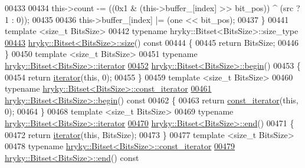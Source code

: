\begin{DoxyCode}
00433 
00434     this->count -= ((0x1 & (this->buffer\_[index] >> bit\_pos)) ^ (src ? 1 : 0));
00435 
00436     this->buffer\_[index] |= (one << bit\_pos);
00437 \}
00441 \textcolor{keyword}{template} <\textcolor{keywordtype}{size\_t} BitsSize>
00442 \textcolor{keyword}{typename} hryky::Bitset<BitsSize>::size\_type
\hypertarget{bitset_8h_source_l00443}{}\hyperlink{classhryky_1_1_bitset_a0d41c36d998c4e7bbd1c3d12b9ea199c}{00443} \hyperlink{classhryky_1_1_bitset}{hryky::Bitset<BitsSize>::size}()\textcolor{keyword}{ const}
00444 \textcolor{keyword}{}\{
00445     \textcolor{keywordflow}{return} BitsSize;
00446 \}
00450 \textcolor{keyword}{template} <\textcolor{keywordtype}{size\_t} BitsSize>
00451 \textcolor{keyword}{typename} \hyperlink{classhryky_1_1iterator_1_1random_1_1_mutable}{hryky::Bitset<BitsSize>::iterator} 
\hypertarget{bitset_8h_source_l00452}{}\hyperlink{classhryky_1_1_bitset_aabb589198362742daad95e914b590187}{00452} \hyperlink{classhryky_1_1_bitset}{hryky::Bitset<BitsSize>::begin}()
00453 \{
00454     \textcolor{keywordflow}{return} \hyperlink{classhryky_1_1iterator_1_1random_1_1_mutable}{iterator}(\textcolor{keyword}{this}, 0);
00455 \}
00459 \textcolor{keyword}{template} <\textcolor{keywordtype}{size\_t} BitsSize>
00460 \textcolor{keyword}{typename} \hyperlink{classhryky_1_1iterator_1_1random_1_1_immutable}{hryky::Bitset<BitsSize>::const_iterator} 
\hypertarget{bitset_8h_source_l00461}{}\hyperlink{classhryky_1_1_bitset_ac4b8961a631215c83c16077e97239dc9}{00461} \hyperlink{classhryky_1_1_bitset}{hryky::Bitset<BitsSize>::begin}()\textcolor{keyword}{ const}
00462 \textcolor{keyword}{}\{
00463     \textcolor{keywordflow}{return} \hyperlink{classhryky_1_1iterator_1_1random_1_1_immutable}{const_iterator}(\textcolor{keyword}{this}, 0);
00464 \}
00468 \textcolor{keyword}{template} <\textcolor{keywordtype}{size\_t} BitsSize>
00469 \textcolor{keyword}{typename} \hyperlink{classhryky_1_1iterator_1_1random_1_1_mutable}{hryky::Bitset<BitsSize>::iterator} 
\hypertarget{bitset_8h_source_l00470}{}\hyperlink{classhryky_1_1_bitset_a1b66eeafa0a16b7bd4b7914421b59c60}{00470} \hyperlink{classhryky_1_1_bitset}{hryky::Bitset<BitsSize>::end}()
00471 \{
00472     \textcolor{keywordflow}{return} \hyperlink{classhryky_1_1iterator_1_1random_1_1_mutable}{iterator}(\textcolor{keyword}{this}, BitsSize);
00473 \}
00477 \textcolor{keyword}{template} <\textcolor{keywordtype}{size\_t} BitsSize>
00478 \textcolor{keyword}{typename} \hyperlink{classhryky_1_1iterator_1_1random_1_1_immutable}{hryky::Bitset<BitsSize>::const_iterator} 
\hypertarget{bitset_8h_source_l00479}{}\hyperlink{classhryky_1_1_bitset_ab0cc44b3036eccc8f56c4322f14fc50e}{00479} \hyperlink{classhryky_1_1_bitset}{hryky::Bitset<BitsSize>::end}()\textcolor{keyword}{ const}

\end{DoxyCode}

